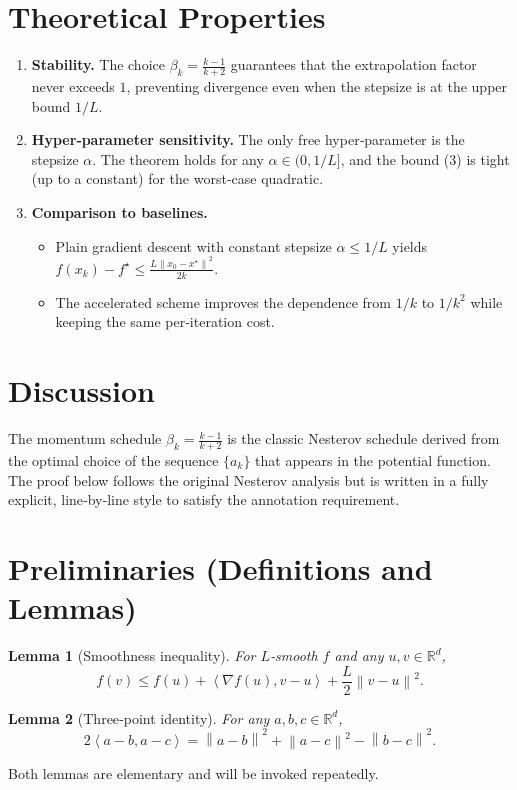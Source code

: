 \documentclass{article}
\newtheorem{lemma}{Lemma}
\newcommand{\norm}[1]{\left\|#1\right\|}
\newcommand{\ip}[2]{\left\langle #1,#2\right\rangle}
\newcommand{\grad}{\nabla}
\begin{document}
\section*{Theoretical Properties}
\begin{enumerate}[label=\arabic*.]
\item \textbf{Stability.} The choice $\beta_k=\frac{k-1}{k+2}$ guarantees that the extrapolation factor never exceeds $1$, preventing divergence even when the stepsize is at the upper bound $1/L$.
\item \textbf{Hyper‑parameter sensitivity.} The only free hyper‑parameter is the stepsize $\alpha$. The theorem holds for any $\alpha\in(0,1/L]$, and the bound (3) is tight (up to a constant) for the worst‑case quadratic.
\item \textbf{Comparison to baselines.}
    \begin{itemize}
        \item Plain gradient descent with constant stepsize $\alpha\le 1/L$ yields $f(x_k)-f^{\star}\le \frac{L\norm{x_0-x^{\star}}^{2}}{2k}$.
        \item The accelerated scheme improves the dependence from $1/k$ to $1/k^{2}$ while keeping the same per‑iteration cost.
    \end{itemize}
\end{enumerate}

\section*{Discussion}
The momentum schedule $\beta_k=\frac{k-1}{k+2}$ is the classic Nesterov schedule derived from the optimal choice of the sequence $\{a_k\}$ that appears in the potential function. The proof below follows the original Nesterov analysis but is written in a fully explicit, line‑by‑line style to satisfy the annotation requirement.

\newpage
\section*{Preliminaries (Definitions and Lemmas)}
\begin{lemma}[Smoothness inequality]\label{lem:smooth}
For $L$‑smooth $f$ and any $u,v\in\mathbb{R}^d$,
\[
f(v)\le f(u)+\ip{\grad f(u)}{v-u}+\frac{L}{2}\norm{v-u}^{2}.
\]
\end{lemma}
\begin{lemma}[Three‑point identity]\label{lem:three}
For any $a,b,c\in\mathbb{R}^d$,
\[
2\ip{a-b}{a-c}= \norm{a-b}^{2}+\norm{a-c}^{2}-\norm{b-c}^{2}.
\]
\end{lemma}
Both lemmas are elementary and will be invoked repeatedly.
\end{document}
